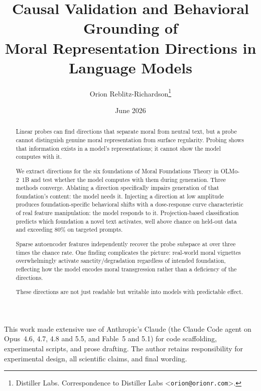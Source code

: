 \documentclass{article}
\title{Causal Validation and Behavioral Grounding of\\
  Moral Representation Directions in Language Models}
\author{%
  Orion Reblitz-Richardson\thanks{%
    Distiller Labs. Correspondence to Distiller Labs
    \textless\texttt{orion@orionr.com}\textgreater.}
}
\date{June 2026}
\begin{document}
\maketitle

\begin{abstract}
Linear probes can find directions that separate moral from neutral
text, but a probe cannot distinguish genuine moral representation from
surface regularity. Probing shows that information exists in a model's
representations; it cannot show the model computes with it.

We extract directions for the six foundations of Moral Foundations
Theory in OLMo-2~1B and test whether the model computes with them
during generation. Three methods converge. Ablating a direction
specifically impairs generation of that foundation's content: the
model needs it. Injecting a direction at low amplitude produces
foundation-specific behavioral shifts with a dose-response curve
characteristic of real feature manipulation: the model responds to it.
Projection-based classification predicts which foundation a novel text
activates, well above chance on held-out data and exceeding 80\% on
targeted prompts.

Sparse autoencoder features independently recover the probe subspace
at over three times the chance rate. One finding complicates the
picture: real-world moral vignettes overwhelmingly activate
sanctity/degradation regardless of intended foundation, reflecting how
the model encodes moral transgression rather than a deficiency of the
directions.

These directions are not just readable but writable into models with
predictable effect.
\end{abstract}








\begin{ack}
This work made extensive use of Anthropic's Claude (the Claude Code agent on
Opus~4.6, 4.7, 4.8 and 5.5, and Fable~5 and 5.1) for code scaffolding, experimental scripts, and
prose drafting. The author retains responsibility for experimental design, all
scientific claims, and final wording.
\end{ack}
\end{document}
